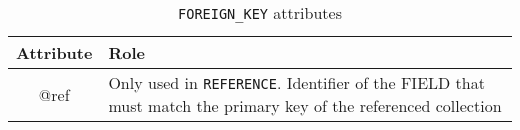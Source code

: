 \begin{table}[!htbp]
\small
\centering
\begin{tabulary}{\linewidth}{|c|J|}       
       \hline 
            \textbf{Attribute} & 
            \textbf {Role}\\
       \hline         \hline  
             @ref& 
             Only used in \texttt{REFERENCE}. Identifier of the FIELD that must  match the primary key of the referenced collection \\
     \hline
     \end{tabulary}
     \caption{\texttt{FOREIGN\_KEY} attributes} 
     \label{tbl:foreignkey-att}
 \end{table}
